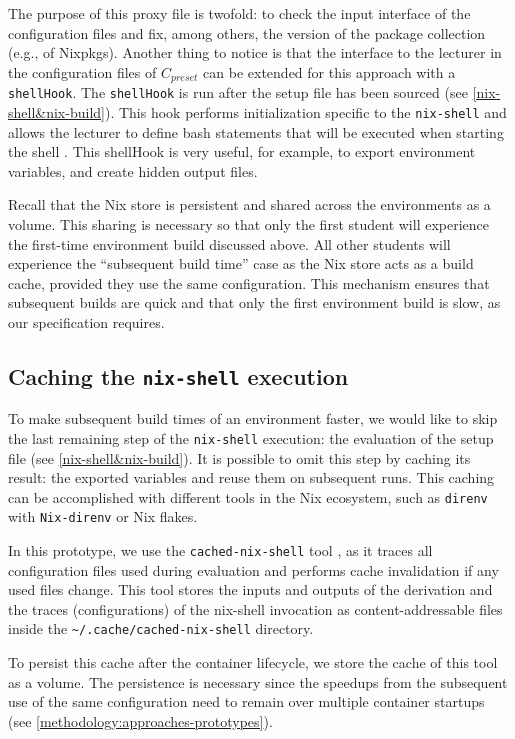The purpose of this proxy file is twofold: to check the input interface of the configuration files and fix, among others, the version of the package collection (e.g., of Nixpkgs). Another thing to notice is that the interface to the lecturer in the configuration files of $C_{preset}$ can be extended for this approach with a \verb|shellHook|. The \verb|shellHook| is run after the setup file has been sourced (see \ref{nix-shell&nix-build}). This hook performs initialization specific to the \verb|nix-shell| and allows the lecturer to define bash statements that will be executed when starting the shell \cite{NixShell}. This shellHook is very useful, for example, to export environment variables, and create hidden output files.

Recall that the Nix store is persistent and shared across the environments as a volume. This sharing is necessary so that only the first student will experience the first-time environment build discussed above. All other students will experience the ``subsequent build time'' case as the Nix store acts as a build cache, provided they use the same configuration. This mechanism ensures that subsequent builds are quick and that only the first environment build is slow, as our specification requires.
\subsection{Caching the \textbf{\texttt{nix-shell}} execution}\label{caching-nix-shell} 
To make subsequent build times of an environment faster, we would like to skip the last remaining step of the \verb|nix-shell| execution: the evaluation of the setup file (see \ref{nix-shell&nix-build}). It is possible to omit this step by caching its result: the exported variables and reuse them on subsequent runs. This caching can be accomplished with different tools in the Nix ecosystem, such as \verb|direnv| with \verb|Nix-direnv| or Nix flakes. 

In this prototype, we use the \verb|cached-nix-shell| tool \cite{CachedNixShell}, as it traces all configuration files used during evaluation and performs cache invalidation if any used files change. This tool stores the inputs and outputs of the derivation and the traces (configurations) of the nix-shell invocation as content-addressable files inside the \verb|~/.cache/cached-nix-shell| directory.

To persist this cache after the container lifecycle, we store the cache of this tool as a volume. The persistence is necessary since the speedups from the subsequent use of the same configuration need to remain over multiple container startups (see \ref{methodology:approaches-prototypes}). 
